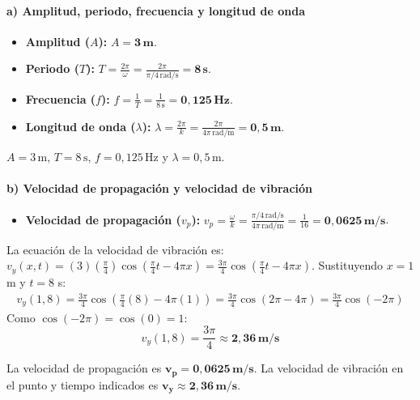 \paragraph{a) Amplitud, periodo, frecuencia y longitud de onda}
\begin{itemize}
    \item \textbf{Amplitud ($A$):} $A = \boldsymbol{3 \, \textbf{m}}$.
    \item \textbf{Periodo ($T$):} $T = \frac{2\pi}{\omega} = \frac{2\pi}{\pi/4 \, \text{rad/s}} = \boldsymbol{8 \, \textbf{s}}$.
    \item \textbf{Frecuencia ($f$):} $f = \frac{1}{T} = \frac{1}{8 \, \text{s}} = \boldsymbol{0,125 \, \textbf{Hz}}$.
    \item \textbf{Longitud de onda ($\lambda$):} $\lambda = \frac{2\pi}{k} = \frac{2\pi}{4\pi \, \text{rad/m}} = \boldsymbol{0,5 \, \textbf{m}}$.
\end{itemize}
\begin{cajaresultado}
$A = 3\,\text{m}$, $T = 8\,\text{s}$, $f = 0,125\,\text{Hz}$ y $\lambda = 0,5\,\text{m}$.
\end{cajaresultado}

\paragraph{b) Velocidad de propagación y velocidad de vibración}
\begin{itemize}
    \item \textbf{Velocidad de propagación ($v_p$):} $v_p = \frac{\omega}{k} = \frac{\pi/4 \, \text{rad/s}}{4\pi \, \text{rad/m}} = \frac{1}{16} = \boldsymbol{0,0625 \, \textbf{m/s}}$.
\end{itemize}
La ecuación de la velocidad de vibración es:
$v_y(x,t) = (3)\left(\frac{\pi}{4}\right)\cos\left(\frac{\pi}{4}t - 4\pi x\right) = \frac{3\pi}{4}\cos\left(\frac{\pi}{4}t - 4\pi x\right)$.
Sustituyendo $x=1$ m y $t=8$ s:
\begin{gather}
    v_y(1, 8) = \frac{3\pi}{4}\cos\left(\frac{\pi}{4}(8) - 4\pi (1)\right) = \frac{3\pi}{4}\cos(2\pi - 4\pi) = \frac{3\pi}{4}\cos(-2\pi)
\end{gather}
Como $\cos(-2\pi) = \cos(0) = 1$:
$$ v_y(1, 8) = \frac{3\pi}{4} \approx \boldsymbol{2,36 \, \textbf{m/s}} $$
\begin{cajaresultado}
La velocidad de propagación es $\boldsymbol{v_p = 0,0625\,\textbf{m/s}}$.
La velocidad de vibración en el punto y tiempo indicados es $\boldsymbol{v_y \approx 2,36\,\textbf{m/s}}$.
\end{cajaresultado}

